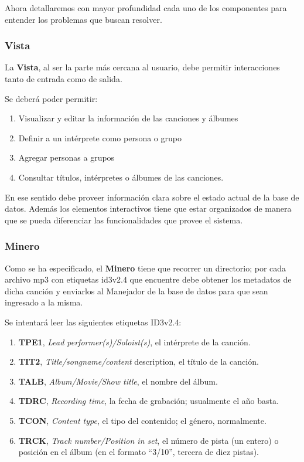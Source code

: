 \documentclass{rep}
\begin{document}
    Ahora detallaremos con mayor profundidad cada uno de los
    componentes para entender los problemas que buscan resolver.

    \subsubsection{Vista}
    
    La \textbf{Vista}, al ser la parte más cercana al usuario, debe permitir
    interacciones tanto de entrada como de salida.

    Se deberá poder permitir:
    \begin{enumerate}
    \item Visualizar y editar la información de las canciones y álbumes
    \item Definir a un intérprete como persona o grupo
    \item Agregar personas a grupos
    \item Consultar títulos, intérpretes o álbumes de las canciones.
    \end{enumerate}

    En ese sentido debe proveer información clara sobre el estado
    actual de la base de datos. Además los elementos interactivos
    tiene que estar organizados de manera que se pueda diferenciar las
    funcionalidades que provee el sistema.
    
    \subsubsection{Minero}

    Como se ha especificado, el \textbf{Minero} tiene que recorrer un
    directorio; por cada archivo mp3 con etiquetas id3v2.4 que
    encuentre debe obtener los metadatos de dicha canción y enviarlos
    al Manejador de la base de datos para que sean ingresado a la misma.
    
    Se intentará leer las siguientes etiquetas ID3v2.4:

    \begin{enumerate}
    \item \textbf{TPE1}, \textit{Lead performer(s)/Soloist(s)}, el
      intérprete de la canción.
    \item \textbf{TIT2}, \textit{Title/songname/content} description,
      el título de la canción.
    \item \textbf{TALB}, \textit{Album/Movie/Show title}, el nombre
      del álbum.
    \item \textbf{TDRC}, \textit{Recording time}, la fecha de
      grabación; usualmente el año basta.
    \item \textbf{TCON}, \textit{Content type}, el tipo del contenido;
      el género, normalmente.
    \item \textbf{TRCK}, \textit{Track number/Position in set}, el
      número de pista (un entero) o posición en el álbum (en el
      formato “3/10”, tercera de diez pistas).
    \end{enumerate}
\end{document}
